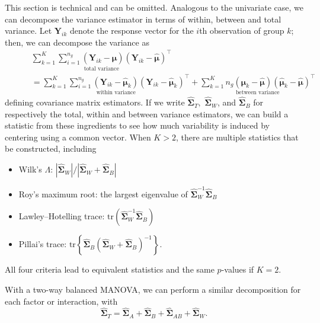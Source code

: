 \documentclass[
  11pt,
  letterpaper,
]{scrbook}
\providecommand{\tightlist}{%
  \setlength{\itemsep}{0pt}\setlength{\parskip}{0pt}}\usepackage{longtable,booktabs,array}
\theoremstyle{definition}
\theoremstyle{definition}
\theoremstyle{remark}
\begin{document}
This section is technical and can be omitted. Analogous to the
univariate case, we can decompose the variance estimator in terms of
within, between and total variance. Let \(\boldsymbol{Y}_{ik}\) denote
the response vector for the \(i\)th observation of group \(k\); then, we
can decompose the variance as \begin{align*} &
\underset{\text{total variance}}{\sum_{k=1}^K \sum_{i=1}^{n_g} (\boldsymbol{Y}_{ik} - \widehat{\boldsymbol{\mu}})(\boldsymbol{Y}_{ik} - \widehat{\boldsymbol{\mu}})^\top} \\\qquad &= \underset{\text{within variance}}{\sum_{k=1}^K \sum_{i=1}^{n_g} (\boldsymbol{Y}_{ik} - \widehat{\boldsymbol{\mu}}_k)(\boldsymbol{Y}_{ik} - \widehat{\boldsymbol{\mu}}_k)^\top} + \underset{\text{between variance}}{\sum_{k=1}^K n_g(\boldsymbol{\mu}_{k} - \widehat{\boldsymbol{\mu}})(\widehat{\boldsymbol{\mu}}_k - \widehat{\boldsymbol{\mu}})^\top}
\end{align*} defining covariance matrix estimators. If we write
\(\widehat{\boldsymbol{\Sigma}}_T,\)
\(\widehat{\boldsymbol{\Sigma}}_W\), and
\(\widehat{\boldsymbol{\Sigma}}_B\) for respectively the total, within
and between variance estimators, we can build a statistic from these
ingredients to see how much variability is induced by centering using a
common vector. When \(K>2\), there are multiple statistics that be
constructed, including

\begin{itemize}
\tightlist
\item
  Wilk's \(\Lambda\):
  \(|\widehat{\boldsymbol{\Sigma}}_W|/|\widehat{\boldsymbol{\Sigma}}_W + \widehat{\boldsymbol{\Sigma}}_B|\)
\item
  Roy's maximum root: the largest eigenvalue of
  \(\widehat{\boldsymbol{\Sigma}}_W^{-1}\widehat{\boldsymbol{\Sigma}}_B\)
\item
  Lawley--Hotelling trace:
  \(\mathrm{tr}(\widehat{\boldsymbol{\Sigma}}_W^{-1}\widehat{\boldsymbol{\Sigma}}_B)\)
\item
  Pillai's trace:
  \(\mathrm{tr}\left\{\widehat{\boldsymbol{\Sigma}}_B(\widehat{\boldsymbol{\Sigma}}_W +\widehat{\boldsymbol{\Sigma}}_B)^{-1}\right\}\).
\end{itemize}

All four criteria lead to equivalent statistics and the same
\(p\)-values if \(K=2\).

With a two-way balanced MANOVA, we can perform a similar decomposition
for each factor or interaction, with
\[\widehat{\boldsymbol{\Sigma}}_T = \widehat{\boldsymbol{\Sigma}}_A + \widehat{\boldsymbol{\Sigma}}_B + \widehat{\boldsymbol{\Sigma}}_{AB} + \widehat{\boldsymbol{\Sigma}}_W.\]
\end{document}
